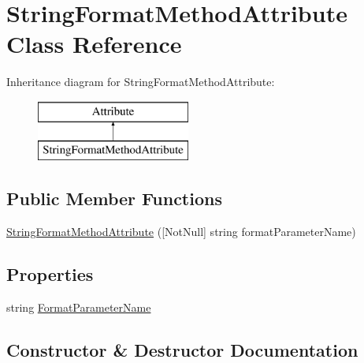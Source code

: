 \hypertarget{class_string_format_method_attribute}{}\section{String\+Format\+Method\+Attribute Class Reference}
\label{class_string_format_method_attribute}
Inheritance diagram for String\+Format\+Method\+Attribute\+:\begin{figure}[H]
\begin{center}
\leavevmode
\includegraphics[height=2.000000cm]{class_string_format_method_attribute}
\end{center}
\end{figure}
\subsection*{Public Member Functions}
\begin{DoxyCompactItemize}
\item 
\mbox{\hyperlink{class_string_format_method_attribute_a68911e2dabb1b9f238f9605bde469e97}{String\+Format\+Method\+Attribute}} (\mbox{[}Not\+Null\mbox{]} string format\+Parameter\+Name)
\end{DoxyCompactItemize}
\subsection*{Properties}
\begin{DoxyCompactItemize}
\item 
string \mbox{\hyperlink{class_string_format_method_attribute_a93e8904b7dfa6cdd20798a5ae4d3423e}{Format\+Parameter\+Name}}
\end{DoxyCompactItemize}


\subsection{Constructor \& Destructor Documentation}
\mbox{\label{class_string_format_method_attribute_a68911e2dabb1b9f238f9605bde469e97}} 
